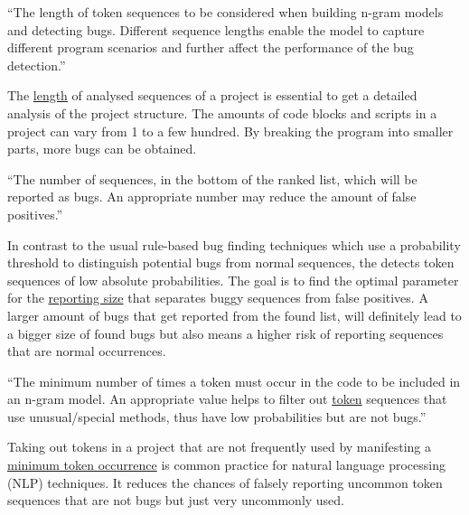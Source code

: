 \begin{definition}\label{def:sequence_length}
    ``The length of token sequences to be considered when building n-gram models and detecting bugs. Different sequence lengths enable the model to capture different program scenarios and further affect the performance of the bug detection.''~\cite{bugram}
\end{definition}

The \hyperref[def:sequence_length]{length} of analysed sequences of a project is essential to get a detailed analysis of the project structure. The amounts of code blocks and scripts in a \scratch{} project can vary from 1 to a few hundred. By breaking the program into smaller parts, more bugs can be obtained.

\begin{definition}\label{def:reporting_size}
    ``The number of sequences, in the bottom of the ranked list, which will be reported as bugs. An appropriate number may reduce the amount of false positives.''~\cite{bugram}
\end{definition}

In contrast to the usual rule-based bug finding techniques which use a probability threshold to distinguish potential bugs from normal sequences, the \ngram{} detects token sequences of low absolute probabilities. The goal is to find the optimal parameter for the \hyperref[def:reporting_size]{reporting size} that separates buggy sequences from false positives. A larger amount of bugs that get reported from the found list, will definitely lead to a bigger size of found bugs but also means a higher risk of reporting sequences that are normal occurrences.

\begin{definition}\label{def:minimum_token_occurrence}
    ``The minimum number of times a token must occur in the code to be included in an n-gram model. An appropriate value helps to filter out \hyperref[def:token]{token} sequences that use unusual/special methods, thus have low probabilities but are not bugs.''~\cite{bugram}
\end{definition}

Taking out tokens in a project that are not frequently used by manifesting a \hyperref[def:minimum_token_occurrence]{minimum token occurrence} is common practice for natural language processing (NLP) techniques. It reduces the chances of falsely reporting uncommon token sequences that are not bugs but just very uncommonly used. 

